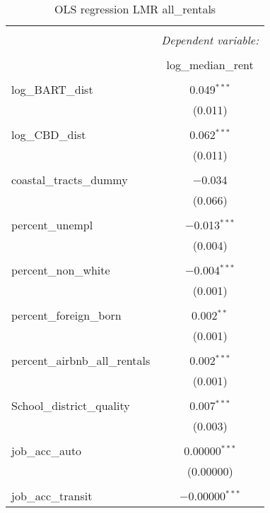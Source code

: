 \documentclass[10pt, letterpaper]{amsart}
\begin{document}
\begin{table}[H] \centering 
  \caption{OLS regression LMR all\_rentals} 
  \label{} 
  \begin{tabular}{@{\extracolsep{5pt}}lc} 
    \\[-1.8ex]\hline 
    \hline \\[-1.8ex] 
    & \multicolumn{1}{c}{\textit{Dependent variable:}} \\ 
    \cline{2-2} 
    \\[-1.8ex] & log\_median\_rent \\ 
    \hline \\[-1.8ex] 
    log\_BART\_dist & 0.049$^{***}$ \\ 
    & (0.011) \\ 
    & \\ 
    log\_CBD\_dist & 0.062$^{***}$ \\ 
    & (0.011) \\ 
    & \\ 
    coastal\_tracts\_dummy & $-$0.034 \\ 
    & (0.066) \\ 
    & \\ 
    percent\_unempl & $-$0.013$^{***}$ \\ 
    & (0.004) \\ 
    & \\ 
    percent\_non\_white & $-$0.004$^{***}$ \\ 
    & (0.001) \\ 
    & \\ 
    percent\_foreign\_born & 0.002$^{**}$ \\ 
    & (0.001) \\ 
    & \\ 
    percent\_airbnb\_all\_rentals & 0.002$^{***}$ \\ 
    & (0.001) \\ 
    & \\ 
    School\_district\_quality & 0.007$^{***}$ \\ 
    & (0.003) \\ 
    & \\ 
    job\_acc\_auto & 0.00000$^{***}$ \\ 
    & (0.00000) \\ 
    & \\ 
    job\_acc\_transit & $-$0.00000$^{***}$ \\ 

\end{tabular}
\end{table}
\end{document}
